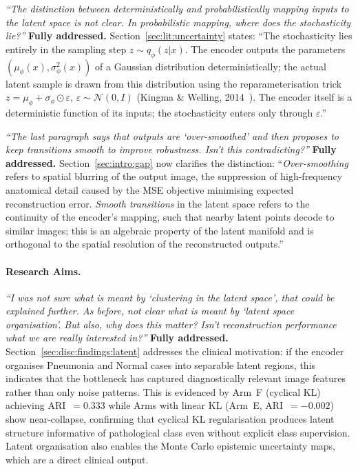 \documentclass[12pt, a4paper, twoside, openright]{book}
\begin{document}
\begin{appendices}
\textit{``The distinction between deterministically and probabilistically mapping inputs to the latent space is not clear. In probabilistic mapping, where does the stochasticity lie?''}
\textbf{Fully addressed.} Section~\ref{sec:lit:uncertainty} states: ``The stochasticity lies entirely in the sampling step $z \sim q_\phi(z|x)$. The encoder outputs the parameters $(\mu_\phi(x), \sigma^2_\phi(x))$ of a Gaussian distribution deterministically; the actual latent sample is drawn from this distribution using the reparameterisation trick $z = \mu_\phi + \sigma_\phi \odot \varepsilon$, $\varepsilon \sim \mathcal{N}(0,I)$ (Kingma \& Welling, 2014~\cite{kingma_auto-encoding_2014}). The encoder itself is a deterministic function of its inputs; the stochasticity enters only through $\varepsilon$.''

\textit{``The last paragraph says that outputs are `over-smoothed' and then proposes to keep transitions smooth to improve robustness. Isn't this contradicting?''}
\textbf{Fully addressed.} Section~\ref{sec:intro:gap} now clarifies the distinction: ``\emph{Over-smoothing} refers to spatial blurring of the output image, the suppression of high-frequency anatomical detail caused by the MSE objective minimising expected reconstruction error. \emph{Smooth transitions} in the latent space refers to the continuity of the encoder's mapping, such that nearby latent points decode to similar images; this is an algebraic property of the latent manifold and is orthogonal to the spatial resolution of the reconstructed outputs.''

\paragraph{Research Aims.}
\textit{``I was not sure what is meant by `clustering in the latent space', that could be explained further. As before, not clear what is meant by `latent space organisation'. But also, why does this matter? Isn't reconstruction performance what we are really interested in?''}
\textbf{Fully addressed.} Section~\ref{sec:disc:findings:latent} addresses the clinical motivation: if the encoder organises Pneumonia and Normal cases into separable latent regions, this indicates that the bottleneck has captured diagnostically relevant image features rather than only noise patterns. This is evidenced by Arm~F (cyclical KL) achieving ARI~$=0.333$ while Arms with linear KL (Arm~E, ARI~$=-0.002$) show near-collapse, confirming that cyclical KL regularisation produces latent structure informative of pathological class even without explicit class supervision. Latent organisation also enables the Monte Carlo epistemic uncertainty maps, which are a direct clinical output.


\end{appendices}
\end{document}
